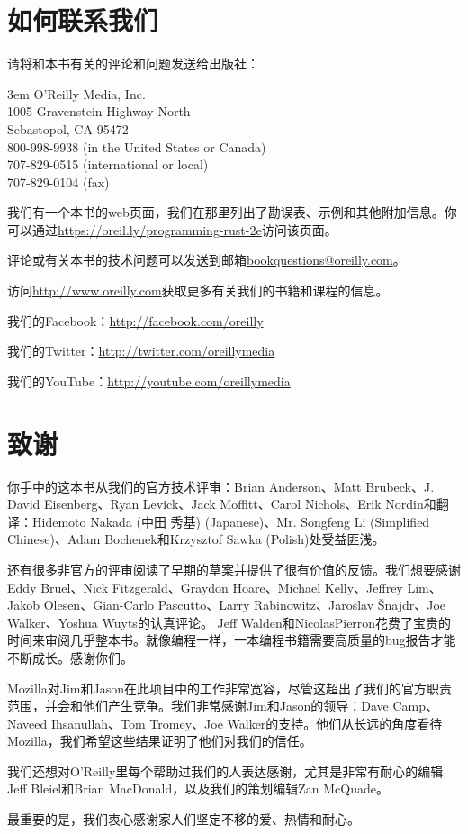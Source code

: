 \section*{如何联系我们}
请将和本书有关的评论和问题发送给出版社：

\hangindent 3em
\noindent
\large{O'Reilly Media, Inc.}\\
\large{1005 Gravenstein Highway North}\\
\large{Sebastopol, CA 95472}\\
\large{800-998-9938 (in the United States or Canada)}\\
\large{707-829-0515 (international or local)}\\
\large{707-829-0104 (fax)}

我们有一个本书的web页面，我们在那里列出了勘误表、示例和其他附加信息。你可以通过\url{https://oreil.ly/programming-rust-2e}访问该页面。

评论或有关本书的技术问题可以发送到邮箱\url{bookquestions@oreilly.com}。

访问\url{http://www.oreilly.com}获取更多有关我们的书籍和课程的信息。

我们的Facebook：\url{http://facebook.com/oreilly}

我们的Twitter：\url{http://twitter.com/oreillymedia}

我们的YouTube：\url{http://youtube.com/oreillymedia}

\section*{致谢}
你手中的这本书从我们的官方技术评审：Brian Anderson、Matt Brubeck、J. David Eisenberg、Ryan Levick、Jack Moffitt、Carol Nichols、Erik Nordin和翻译：Hidemoto Nakada (中田 秀基) (Japanese)、Mr. Songfeng Li (Simplified Chinese)、Adam Bochenek和Krzysztof Sawka (Polish)处受益匪浅。

还有很多非官方的评审阅读了早期的草案并提供了很有价值的反馈。我们想要感谢Eddy Bruel、Nick Fitzgerald、Graydon Hoare、Michael Kelly、Jeffrey Lim、Jakob Olesen、Gian-Carlo Pascutto、Larry Rabinowitz、Jaroslav Šnajdr、Joe Walker、Yoshua Wuyts的认真评论。
Jeff Walden和NicolasPierron花费了宝贵的时间来审阅几乎整本书。就像编程一样，一本编程书籍需要高质量的bug报告才能不断成长。感谢你们。

Mozilla对Jim和Jason在此项目中的工作非常宽容，尽管这超出了我们的官方职责范围，并会和他们产生竞争。我们非常感谢Jim和Jason的领导：Dave Camp、Naveed Ihsanullah、Tom Tromey、Joe Walker的支持。他们从长远的角度看待Mozilla，我们希望这些结果证明了他们对我们的信任。

我们还想对O'Reilly里每个帮助过我们的人表达感谢，尤其是非常有耐心的编辑Jeff Bleiel和Brian MacDonald，以及我们的策划编辑Zan McQuade。

最重要的是，我们衷心感谢家人们坚定不移的爱、热情和耐心。